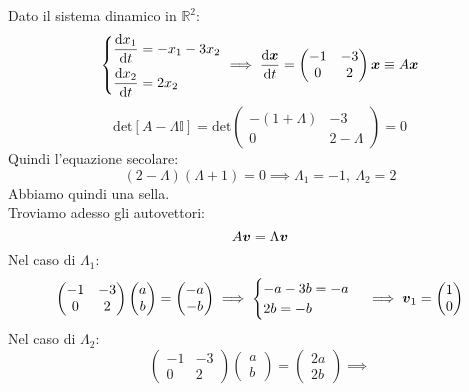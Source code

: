 \begin{exmp}
    Dato il sistema dinamico in $\mathbb{R}^2$:
    \[\begin{dcases}
        \frac{\text{d} x_1}{\text{d} t} = -x_1 -3x_2\\
	\frac{\text{d} x_2}{\text{d} t} = 2x_2
    \end{dcases}
    \implies  \frac{\text{d} \boldsymbol{x}}{\text{d} t} = \begin{pmatrix} -1 & -3 \\ 0 & 2 \end{pmatrix} \boldsymbol{x}  \equiv A \boldsymbol{x}
    \] 
    \[
	\text{det}\left[A-\Lambda\mathbb{I}\right] = \text{det}\begin{pmatrix} -(1+\Lambda) & -3 \\ 0 & 2-\Lambda \end{pmatrix} = 0
    \] 
    Quindi l'equazione secolare:
    \[
	\left(2-\Lambda\right)\left(\Lambda +1\right)=0 \implies  \Lambda_1 = -1, \ \Lambda_2 = 2
    \] 
    Abbiamo quindi una sella. \\
    Troviamo adesso gli autovettori:
    \[
	A\boldsymbol{v} = \Lambda\boldsymbol{v} 
    \] 
     Nel caso di $\Lambda_1$:
    \[
      \begin{pmatrix} -1 & -3 \\ 0 & 2 \end{pmatrix} \begin{pmatrix} a \\ b \end{pmatrix} = \begin{pmatrix} -a \\-b \end{pmatrix} \implies 
      \begin{cases}
          -a -3b = -a \\
	  2b = -b
      \end{cases}  \implies 
      \boldsymbol{v}_1 = \begin{pmatrix} 1 \\ 0 \end{pmatrix} 
      \] 
      Nel caso di $\Lambda_2$:
      \[
	  \begin{pmatrix} -1 & -3 \\ 0 & 2 \end{pmatrix} \begin{pmatrix} a \\ b \end{pmatrix} = \begin{pmatrix} 2a \\ 2b \end{pmatrix}  \implies  
\]
\end{exmp}
